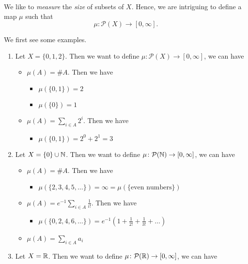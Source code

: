 We like to \emph{measure} the \emph{size} of subsets of \(X\). Hence, we are intriguing to define a map \(\mu\) such that
\[
	\mu\colon \mathcal{P}(X) \to \left[0, \infty\right].
\]
\begin{eg}
	We first see some examples.
	\begin{enumerate}
		\item Let \(X = \{0, 1, 2\}\). Then we want to define \(\mu\colon \mathcal{P}(X)\to \left[0, \infty\right] \), we can have
		      \begin{itemize}
			      \item \(\mu(A) = \# A\). Then we have
			            \begin{itemize}
				            \item \(\mu(\{0, 1\}) = 2\)
				            \item \(\mu(\{0\}) = 1\)
			            \end{itemize}
			      \item \(\mu(A) = \sum\limits_{i\in A} 2^i\). Then we have
			            \begin{itemize}
				            \item \(\mu(\{0, 1\}) = 2^0 + 2^1 = 3\)
			            \end{itemize}
		      \end{itemize}
		\item Let \(X = \{0\}\cup \mathbb{\MakeUppercase{N}} \). Then we want to define \(\mu\colon \mathcal{P}(\mathbb{\MakeUppercase{N}} )\to \left[0, \infty\right] \), we can have
		      \begin{itemize}
			      \item \(\mu(A) = \# A\). Then we have
			            \begin{itemize}
				            \item \(\mu(\{2, 3, 4, 5, \ldots  \}) = \infty = \mu(\{\text{even numbers} \})\)
			            \end{itemize}
			      \item \(\mu(A) = e^{-1}\sum\limits_{i\in A}\frac{1}{i!}\). Then we have
			            \begin{itemize}
				            \item \(\mu(\{0, 2, 4, 6, \ldots \}) = e^{-1} \left(1+\frac{1}{2!}+\frac{1}{3!}+\ldots  \right)\)
			            \end{itemize}
			      \item \(\mu(A) = \sum\limits_{i\in A} a_{i}\)
		      \end{itemize}
		\item Let \(X = \mathbb{\MakeUppercase{R}} \). Then we want to define \(\mu\colon \mathcal{P}(\mathbb{\MakeUppercase{R}} )\to \left[0, \infty\right] \), we can have

\end{enumerate}
\end{eg}
